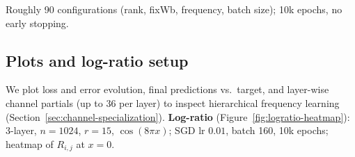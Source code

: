 \documentclass[nohyperref]{article}
\theoremstyle{plain}
\theoremstyle{definition}
\theoremstyle{remark}
\begin{document}
Roughly 90 configurations (rank, fixWb, frequency, batch size); 10k epochs, no early stopping.

\subsection{Plots and log-ratio setup}
\label{app:additional-plots}

We plot loss and error evolution, final predictions vs.\ target, and layer-wise channel partials (up to 36 per layer) to inspect hierarchical frequency learning (Section~\ref{sec:channel-specialization}). \textbf{Log-ratio} (Figure~\ref{fig:logratio-heatmap}): 3-layer, $n{=}1024$, $r{=}15$, $\cos(8\pi x)$; SGD lr $0.01$, batch 160, 10k epochs; heatmap of $R_{i,j}$ at $x{=}0$.
\end{document}
